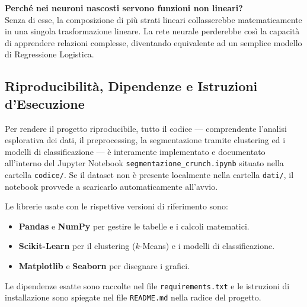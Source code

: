 \documentclass[a4paper,11pt]{article}
\begin{document}
\textbf{Perché nei neuroni nascosti servono funzioni non lineari?}\\
Senza di esse, la composizione di più strati lineari collasserebbe matematicamente in una singola trasformazione lineare. La rete neurale perderebbe così la capacità di apprendere relazioni complesse, diventando equivalente ad un semplice modello di Regressione Logistica.

\subsection{Riproducibilità, Dipendenze e Istruzioni d'Esecuzione}
Per rendere il progetto riproducibile, tutto il codice --- comprendente l'analisi esplorativa dei dati, il preprocessing, la segmentazione tramite clustering ed i modelli di classificazione --- è interamente implementato e documentato all'interno del Jupyter Notebook \texttt{segmentazione\_crunch.ipynb} situato nella cartella \texttt{codice/}. Se il dataset non è presente localmente nella cartella \texttt{dati/}, il notebook provvede a scaricarlo automaticamente all'avvio.

Le librerie usate con le rispettive versioni di riferimento sono:
\begin{itemize}
    \item \textbf{Pandas} e \textbf{NumPy} per gestire le tabelle e i calcoli matematici.
    \item \textbf{Scikit-Learn} per il clustering ($k$-Means) e i modelli di classificazione.
    \item \textbf{Matplotlib} e \textbf{Seaborn} per disegnare i grafici.
\end{itemize}
Le dipendenze esatte sono raccolte nel file \texttt{requirements.txt} e le istruzioni di installazione sono spiegate nel file \texttt{README.md} nella radice del progetto.
\end{document}
